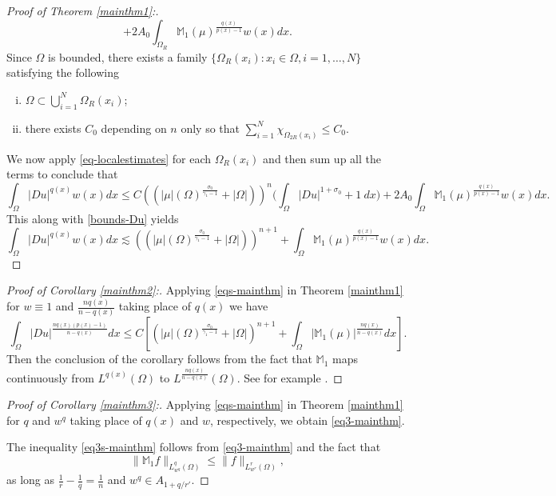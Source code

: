 \documentclass[a4paper,10pt]{amsart}
\newcommand{\Mu}{\mathbb{M}_1(\mu)}
\newcommand{\lesi}{\lesssim}
\newcommand{\px}{p(x)}
\newcommand{\f}{\frac}
\newcommand{\Om}{\Omega}
\begin{document}
\begin{proof}[Proof of Theorem \ref{mainthm1}:]
\begin{equation}
	    +2A_0 \int_{\Om_R}\Mu^{\f{q(x)}{\px-1}}w(x)dx.
	    \end{equation}
	    Since $\Om$ is bounded, there exists a family $\{\Om_R(x_i): x_i\in \Om, i=1,\ldots, N\}$ satisfying the following
	    \begin{enumerate}[(i)]
	    	\item $\Om \subset \bigcup_{i=1}^N \Om_R(x_i)$;
	    	\item there exists $C_0$ depending on $n$ only so that $\sum_{i=1}^N \chi_{\Om_{2R}(x_i)}\leq C_0$.
	    \end{enumerate}
	    We now apply \eqref{eq-localestimates} for each $\Om_{R}(x_i)$ and then sum up all the terms to conclude that
	    $$
	    \int_{\Om}|Du|^{q(x)}w(x)dx \leq C((|\mu|(\Om)^{\f{\sigma_0}{\gamma_1-1}}+|\Om|))^{n}\Big(\int_{\Om}|Du|^{1+\sigma_0} + 1 \ dx\Big)
	    +2A_0 \int_{\Om}\Mu^{\f{q(x)}{\px-1}}w(x)dx.
	    $$
	    This along with \eqref{bounds-Du} yields
	    $$
	    \int_{\Om}|Du|^{q(x)}w(x)dx \lesi ((|\mu|(\Om)^{\f{\sigma_0}{\gamma_1-1}}+|\Om|))^{n+1}
	    + \int_{\Om}\Mu^{\f{q(x)}{\px-1}}w(x)dx.
	    $$
	\end{proof}
	
	\begin{proof}
		[Proof of Corollary \ref{mainthm2}:] 
Applying  \eqref{eqs-mainthm} in Theorem \ref{mainthm1} for $w\equiv 1$ and $\f{nq(x)}{n-q(x)}$ taking place of $q(x)$ we have
		$$
		\int_{\Om} |Du|^{\f{nq(x)(\px-1)}{n-q(x)}}dx \leq C\left[(|\mu|(\Om)^{\f{\sigma_0}{\gamma_1-1}}+|\Om|)^{n+1} + \int_{\Om} |\Mu|^{\f{nq(x)}{n-q(x)}}dx\right].
		$$
		Then the conclusion of the corollary follows from the fact that $\mathbb{M}_1$ maps continuously from $L^{q(x)}(\Om)$ to $L^{\f{nq(x)}{n-q(x)}}(\Om)$. See for example \cite[Theorem 1.3]{CCF}.
	\end{proof}
		
		\bigskip
		
		\begin{proof}[Proof of Corollary \ref{mainthm3}:] 
			Applying  \eqref{eqs-mainthm} in Theorem \ref{mainthm1} for $q$ and $w^q$ taking place of $q(x)$ and $w$, respectively, we obtain \eqref{eq3-mainthm}.
				
				The inequality 	\eqref{eq3s-mainthm} follows from \eqref{eq3-mainthm} and the fact that
				$$
				\|\mathbb{M}_1f\|_{L^q_{w^q}(\Om)}\leq \|f\|_{L^r_{w^r}(\Om)},
				$$
			as long as $\f{1}{r}-\f{1}{q}=\f{1}{n}$ and $w^q\in A_{1+q/r'}$.
				\end{proof}
				
				
			\bigskip
			
\end{document}
